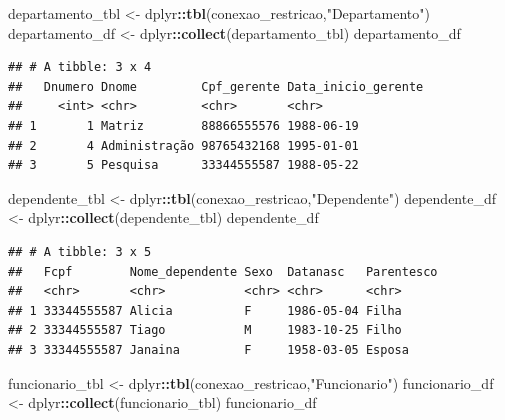 \documentclass[
]{article}
\newenvironment{Shaded}{\begin{snugshade}}{\end{snugshade}}
\newcommand{\FunctionTok}[1]{\textcolor[rgb]{0.13,0.29,0.53}{\textbf{#1}}}
\newcommand{\NormalTok}[1]{#1}
\newcommand{\OtherTok}[1]{\textcolor[rgb]{0.56,0.35,0.01}{#1}}
\newcommand{\SpecialCharTok}[1]{\textcolor[rgb]{0.81,0.36,0.00}{\textbf{#1}}}
\newcommand{\StringTok}[1]{\textcolor[rgb]{0.31,0.60,0.02}{#1}}
\begin{document}
\begin{Shaded}
\begin{Highlighting}[]
\NormalTok{departamento\_tbl }\OtherTok{\textless{}{-}}\NormalTok{ dplyr}\SpecialCharTok{::}\FunctionTok{tbl}\NormalTok{(conexao\_restricao,}\StringTok{"Departamento"}\NormalTok{)}
\NormalTok{departamento\_df }\OtherTok{\textless{}{-}}\NormalTok{ dplyr}\SpecialCharTok{::}\FunctionTok{collect}\NormalTok{(departamento\_tbl)}
\NormalTok{departamento\_df}
\end{Highlighting}
\end{Shaded}

\begin{verbatim}
## # A tibble: 3 x 4
##   Dnumero Dnome         Cpf_gerente Data_inicio_gerente
##     <int> <chr>         <chr>       <chr>              
## 1       1 Matriz        88866555576 1988-06-19         
## 2       4 Administração 98765432168 1995-01-01         
## 3       5 Pesquisa      33344555587 1988-05-22
\end{verbatim}

\begin{Shaded}
\begin{Highlighting}[]
\NormalTok{dependente\_tbl }\OtherTok{\textless{}{-}}\NormalTok{ dplyr}\SpecialCharTok{::}\FunctionTok{tbl}\NormalTok{(conexao\_restricao,}\StringTok{"Dependente"}\NormalTok{)}
\NormalTok{dependente\_df }\OtherTok{\textless{}{-}}\NormalTok{ dplyr}\SpecialCharTok{::}\FunctionTok{collect}\NormalTok{(dependente\_tbl)}
\NormalTok{dependente\_df}
\end{Highlighting}
\end{Shaded}

\begin{verbatim}
## # A tibble: 3 x 5
##   Fcpf        Nome_dependente Sexo  Datanasc   Parentesco
##   <chr>       <chr>           <chr> <chr>      <chr>     
## 1 33344555587 Alicia          F     1986-05-04 Filha     
## 2 33344555587 Tiago           M     1983-10-25 Filho     
## 3 33344555587 Janaina         F     1958-03-05 Esposa
\end{verbatim}

\begin{Shaded}
\begin{Highlighting}[]
\NormalTok{funcionario\_tbl }\OtherTok{\textless{}{-}}\NormalTok{ dplyr}\SpecialCharTok{::}\FunctionTok{tbl}\NormalTok{(conexao\_restricao,}\StringTok{"Funcionario"}\NormalTok{)}
\NormalTok{funcionario\_df }\OtherTok{\textless{}{-}}\NormalTok{ dplyr}\SpecialCharTok{::}\FunctionTok{collect}\NormalTok{(funcionario\_tbl)}
\NormalTok{funcionario\_df}
\end{Highlighting}
\end{Shaded}
\end{document}
